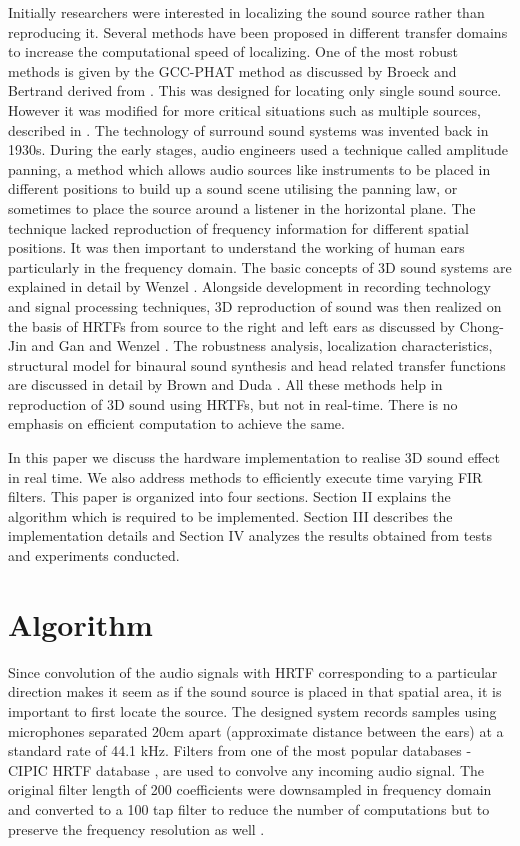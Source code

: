 \documentclass[conference]{IEEEtran}
\begin{document}
Initially researchers were interested in localizing the sound source rather than reproducing it. Several methods have been proposed in different transfer domains to increase the computational speed of localizing. One of the most robust methods is given by the GCC-PHAT method as discussed by Broeck and Bertrand \cite{one} derived from \cite{two}. This was designed for locating only single sound source. However it was modified for more critical situations such as multiple sources, described in \cite{three}. The technology of surround sound systems was invented back in 1930s. During the early stages, audio engineers used a technique called amplitude panning, a method which allows audio sources like instruments to be placed in different positions to build up a sound scene utilising the panning law, or sometimes to place the source around a listener in the horizontal plane. The technique lacked reproduction of frequency information for different spatial positions. It was then important to understand the working of human ears particularly in the frequency domain. The basic concepts of 3D sound systems are explained in detail by Wenzel \cite{four}. Alongside development in recording technology and signal processing techniques, 3D reproduction of sound was then realized on the basis of HRTFs from source to the right and left ears as discussed by Chong-Jin and Gan \cite{six} and Wenzel \cite{four}. The  robustness  analysis,  localization  characteristics,  structural  model  for  binaural  sound  synthesis  and  head related transfer functions are discussed in detail by Brown and Duda \cite{seven}. All these methods help in reproduction of 3D sound using HRTFs, but not in real-time. There is no emphasis on efficient computation to achieve the same.  

In this paper we discuss the hardware implementation to realise 3D sound effect in real time. We also address methods to efficiently execute time varying FIR filters. This paper is organized into four sections. Section II explains the algorithm which is required to be implemented. Section III describes the implementation details and Section IV analyzes the results obtained from tests and experiments conducted.  


\section{Algorithm}

Since convolution of the audio signals with HRTF corresponding to a particular direction makes it seem as if the sound source is placed in that spatial area, it is important to first locate the source. The designed system records samples using microphones separated 20cm apart (approximate distance between the ears) at a standard rate of 44.1 kHz. Filters from one of the most popular databases - CIPIC HRTF database \cite{cipic}, are used to convolve any incoming audio signal. The original filter length of 200 coefficients were downsampled in frequency domain and converted to a 100 tap filter to reduce the number of computations but to preserve the frequency resolution as well .
\end{document}
